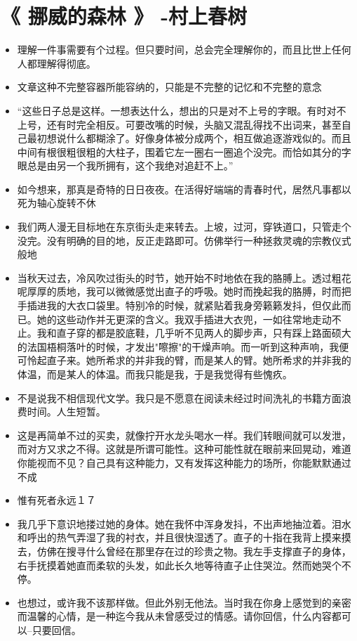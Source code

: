 \documentclass[UTF8,a4paper,8pt]{ctexart}
\begin{document}
 \newpage
 \section{《 挪威的森林 》 -村上春树 }
 \begin{itemize}
 	\item 理解一件事需要有个过程。但只要时间，总会完全理解你的，而且比世上任何人都理解得彻底。
 	\item 文章这种不完整容器所能容纳的，只能是不完整的记忆和不完整的意念
 	\item “这些日子总是这样。一想表达什么，想出的只是对不上号的字眼。有时对不上号，还有时完全相反。可要改嘴的时候，头脑又混乱得找不出词来，甚至自己最初想说什么都糊涂了。好像身体被分成两个，相互做追逐游戏似的。而且中间有根很粗很粗的大柱子，围着它左一圈右一圈追个没完。而恰如其分的字眼总是由另一个我所拥有，这个我绝对追赶不上。”
 	\item 如今想来，那真是奇特的日日夜夜。在活得好端端的青春时代，居然凡事都以死为轴心旋转不休
 	\item 我们两人漫无目标地在东京街头走来转去。上坡，过河，穿铁道口，只管走个没完。没有明确的目的地，反正走路即可。仿佛举行一种拯救灵魂的宗教仪式般地
 	\item 当秋天过去，冷风吹过街头的时节，她开始不时地依在我的胳膊上。透过粗花呢厚厚的质地，我可以微微感觉出直子的呼吸。她时而挽起我的胳膊，时而把手插进我的大衣口袋里。特别冷的时候，就紧贴着我身旁籁籁发抖，但仅此而已。她的这些动作并无更深的含义。我双手插进大衣兜，一如往常地走动不止。我和直子穿的都是胶底鞋，几乎听不见两人的脚步声，只有踩上路面硕大的法国梧桐落叶的时候，才发出"嚓擦"的干燥声响。而一听到这种声响，我便可怜起直子来。她所希求的并非我的臂，而是某人的臂。她所希求的并非我的体温，而是某人的体温。而我只能是我，于是我觉得有些愧疚。
 	\item 不是说我不相信现代文学。我只是不愿意在阅读未经过时间洗礼的书籍方面浪费时间。人生短暂。
 	\item 这是再简单不过的买卖，就像拧开水龙头喝水一样。我们转眼间就可以发泄，而对方又求之不得。这就是所谓可能性。这种可能性就在眼前来回晃动，难道你能视而不见？自己具有这种能力，又有发挥这种能力的场所，你能默默通过不成
 	\item 惟有死者永远１７
 	\item 我几乎下意识地搂过她的身体。她在我怀中浑身发抖，不出声地抽泣着。泪水和呼出的热气弄湿了我的衬衣，并且很快湿透了。直子的十指在我背上摸来摸去，仿佛在搜寻什么曾经在那里存在过的珍贵之物。我左手支撑直子的身体，右手抚摸着她直而柔软的头发，如此长久地等待直子止住哭泣。然而她哭个不停。
 	\item 也想过，或许我不该那样做。但此外别无他法。当时我在你身上感觉到的亲密而温馨的心情，是一种迄今我从未曾感受过的情感。请你回信，什么内容都可以--只要回信。

\end{itemize}
\end{document}
